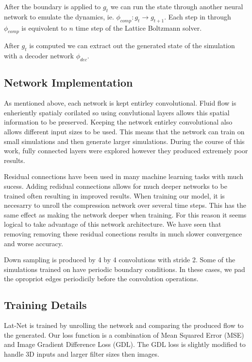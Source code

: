 \documentclass{article}
\begin{document}
After the boundary is applied to $g_t$ we can run the state through another neural network to emulate the dynamics, ie. $\phi_{comp}:g_{t} \rightarrow g_{t+1}$. Each step in through $\phi_{comp}$ is equivolent to $n$ time step of the Lattice Boltzmann solver.

After $g_t$ is computed we can extract out the generated state of the simulation with a decoder network $\phi_{dec}$. 


\subsection{Network Implementation}

As mentioned above, each network is kept entirley convolutional. Fluid flow is enheriently spatialy corilated so using convlutional layers allows this spatial information to be preserved. Keeping the network entirley convolutional also allows different input sizes to be used. This means that the network can train on small simulations and then generate larger simulations. During the course of this work, fully connected layers were explored however they produced extremely poor results.

Residual connections have been used in many machine learning tasks with much sucess. Adding redidual connections allows for much deeper networks to be trained often resulting in improved results. When training our model, it is necesarry to unroll the compression network over several time steps. This has the same effect as making the network deeper when training. For this reason it seems logical to take advantage of this network architecture. We have seen that removing removing these residual conections results in much slower convergence and worse accuracy.

Down sampling is produced by 4 by 4 convolutions with stride 2. Some of the simulations trained on have periodic boundary conditions. In these cases, we pad the opropriot edges periodicily before the convolution operations.


\subsection{Training Details}

Lat-Net is trained by unrolling the network and comparing the produced flow to the generated. Our loss function is a combination of Mean Squared Error (MSE) and Image Gradient Difference Loss (GDL)\cite{mathieu2015deep}. The GDL loss is slightly modified to handle 3D inputs and larger filter sizes then images.
\end{document}
